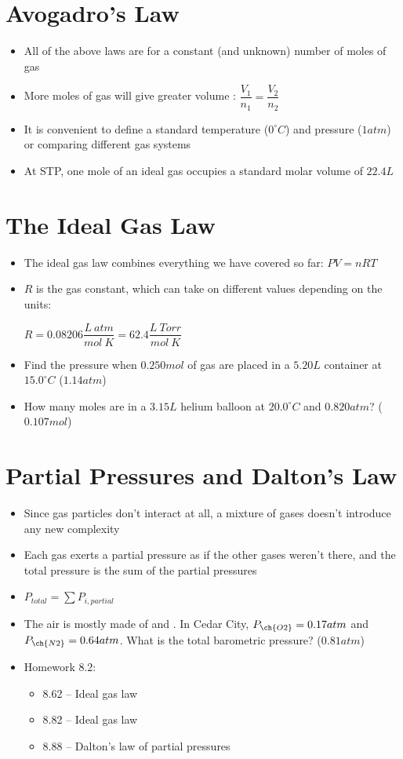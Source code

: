 \documentclass[12pt, openany, letterpaper]{memoir}
\begin{document}
\section{Avogadro's Law}
\begin{itemize}
	\item All of the above laws are for a constant (and unknown) number of moles of gas
	\item More moles of gas will give greater volume : $\dfrac{V_1}{n_1} = \dfrac{V_2}{n_2}$
	\item It is convenient to define a standard temperature ($0^\circ C$) and pressure ($1atm$) or comparing different gas systems
	\item At STP, one mole of an ideal gas occupies a standard molar volume of $22.4L$
\end{itemize}
\section{The Ideal Gas Law}
\begin{itemize}
	\item The ideal gas law combines everything we have covered so far: $PV=nRT$
	\item $R$ is the gas constant, which can take on different values depending on the units:

	      $R=0.08206\dfrac{L~atm}{mol~K} = 62.4\dfrac{L~Torr}{mol~K}$
	\item Find the pressure when $0.250mol$ of gas are placed in a $5.20L$ container at $15.0^\circ C$ ($1.14atm$)
	\item How many moles are in a $3.15L$ helium balloon at $20.0^\circ C$ and $0.820atm$? ($0.107mol$)
\end{itemize}
\section{Partial Pressures and Dalton's Law}
\begin{itemize}
	\item Since gas particles don't interact at all, a mixture of gases doesn't introduce any new complexity
	\item Each gas exerts a partial pressure as if the other gases weren't there, and the total pressure is the sum of the partial pressures
	\item $P_{total} = \sum P_{i, partial}$
	\item The air is mostly made of  and . In Cedar City, $P_{\ch{O2}}=0.17atm$ and $P_{\ch{N2}}=0.64atm$. What is the total barometric pressure? ($0.81atm$)
	\item Homework 8.2:
	      \begin{itemize}
		      \item 8.62 -- Ideal gas law
		      \item 8.82 -- Ideal gas law
		      \item 8.88 -- Dalton's law of partial pressures
	      \end{itemize}
\end{itemize}
\end{document}

